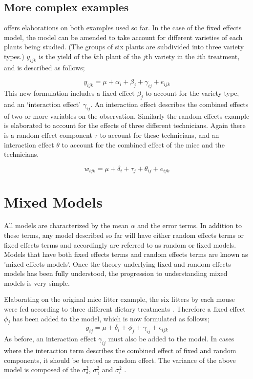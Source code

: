 \documentclass[12pt, a4paper]{report}
\theoremstyle{plain}
\theoremstyle{definition}
\theoremstyle{remark}
\begin{document}
\subsection{More complex examples}
\citet{Searle} offers elaborations on both examples used so far.
In the case of the fixed effects model, the model can be amended
to take account for different varieties of each plants being
studied. (The groups of six plants are subdivided into three
variety types.) $y_{ijk}$ is the yield of the $k$th plant of the
$j$th variety in the $i$th treatment, and is described as follows;

\begin{equation}
y_{ijk} = \mu + \alpha_{i} + \beta_{j} + \gamma_{ij} + e_{ijk}
\end{equation}
This new formulation includes a fixed effect $\beta_{j}$ to
account for the variety type, and an `interaction effect'
$\gamma_{ij}$. An interaction effect describes the combined
effects of two or more variables on the observation. Similarly the
random effects example is elaborated to account for the effects of
three different technicians. Again there is a random effect
component $\tau$ to account for these technicians, and an
interaction effect $\theta$ to account for the combined effect of
the mice and the technicians.

\begin{equation}
w_{ijk} = \mu + \delta_{i} + \tau_{j} + \theta_{ij} + e_{ijk}
\end{equation}

\section{Mixed Models}


All models are characterized by the mean $\alpha$ and the error
terms. In addition to these terms, any model described so far will
have either random effects terms or fixed effects terms and
accordingly are referred to as random or fixed models. Models that
have both fixed effects terms and random effects terms are known
as 'mixed effects models'. Once the theory underlying fixed and
random effects models has been fully understood, the progression
to understanding mixed models is very simple.

Elaborating on the original mice litter example, the six litters
by each mouse were fed according to three different dietary
treatments \citep{Searle}. Therefore a fixed effect $\phi_{j}$ has
been added to the model, which is now formulated as follows;
\begin{equation}
y_{ij} = \mu + \delta_{i} + \phi_{j} + \gamma_{ij} +
\epsilon_{ijk}
\end{equation}
As before, an interaction effect $\gamma_{ij}$ must also be added
to the model. In cases where the interaction term describes the
combined effect of fixed and random components, it should be
treated as random effect. The variance of the above model is
composed of the $\sigma^{2}_{\delta}$, $\sigma^{2}_{\gamma}$ and
$\sigma^{2}_{\epsilon}$ .
\end{document}
